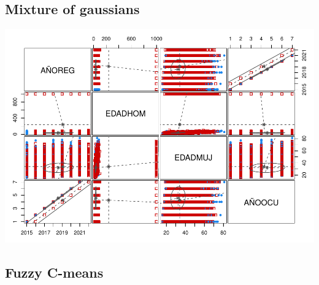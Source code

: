 \documentclass[
]{article}
\begin{document}
\hypertarget{mixture-of-gaussians}{%
\subsection{Mixture of gaussians}\label{mixture-of-gaussians}}

\includegraphics{Proyecto_files/figure-latex/gaussians-1.pdf}

\hypertarget{fuzzy-c-means}{%
\subsection{Fuzzy C-means}\label{fuzzy-c-means}}
\end{document}
